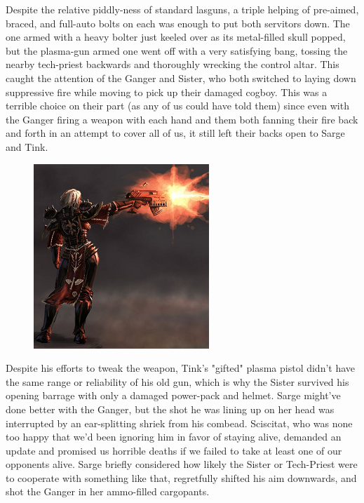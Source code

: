 Despite the relative piddly-ness of standard lasguns, a triple helping of pre-aimed, braced, and full-auto bolts on each was enough to put both servitors down. 
The one armed with a heavy bolter just keeled over as its metal-filled skull popped, but the plasma-gun armed one went off with a very satisfying bang, tossing the nearby tech-priest backwards and thoroughly wrecking the control altar. 
This caught the attention of the Ganger and Sister, who both switched to laying down suppressive fire while moving to pick up their damaged cogboy. 
This was a terrible choice on their part (as any of us could have told them) since even with the Ganger firing a weapon with each hand and them both fanning their fire back and forth in an attempt to cover all of us, it still left their backs open to Sarge and Tink.

\begin{figure}
	\begin{center}
		\includegraphics[width=\figwidth]{pics/18/14.png}
	\end{center}
\end{figure}
Despite his efforts to tweak the weapon, Tink's "gifted" plasma pistol didn't have the same range or reliability of his old gun, which is why the Sister survived his opening barrage with only a damaged power-pack and helmet. 
Sarge might've done better with the Ganger, but the shot he was lining up on her head was interrupted by an ear-splitting shriek from his combead. 
Sciscitat, who was none too happy that we'd been ignoring him in favor of staying alive, demanded an update and promised us horrible deaths if we failed to take at least one of our opponents alive. 
Sarge briefly considered how likely the Sister or Tech-Priest were to cooperate with something like that, regretfully shifted his aim downwards, and shot the Ganger in her ammo-filled cargopants.

